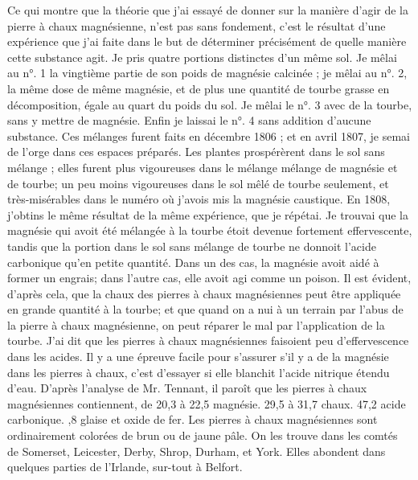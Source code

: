 Ce qui montre que la théorie que j'ai essayé de donner sur la manière d'agir de la pierre à chaux magnésienne, n'est pas sans fondement, c'est le résultat d'une expérience que j'ai faite dans le but de déterminer précisément de quelle manière cette substance agit. Je pris quatre portions distinctes d'un même sol. Je mêlai au n°. 1 la vingtième partie de son poids de magnésie calcinée ; je mêlai au n°. 2, la même dose de même magnésie, et de plus une quantité de tourbe grasse en décomposition, égale au quart du poids du sol. Je mêlai le n°. 3 avec de la tourbe, sans y mettre de magnésie. Enfin je laissai le n°. 4 sans addition d'aucune substance. Ces mélanges furent faits en décembre 1806 ; et en avril 1807, je semai de l'orge dans ces espaces préparés. Les plantes prospérèrent dans le sol sans mélange ; elles furent plus vigoureuses dans le mélange\setcounter{page}{227} mélange de magnésie et de tourbe; un peu moins vigoureuses dans le sol mêlé de tourbe seulement, et très-misérables dans le numéro où j'avois mis la magnésie caustique.
En 1808, j'obtins le même résultat de la même expérience, que je répétai. Je trouvai que la magnésie qui avoit été mélangée à la tourbe étoit devenue fortement effervescente, tandis que la portion dans le sol sans mélange de tourbe ne donnoit l'acide carbonique qu'en petite quantité. Dans un des cas, la magnésie avoit aidé à former un engrais; dans l'autre cas, elle avoit agi comme un poison.
Il est évident, d'après cela, que la chaux des pierres à chaux magnésiennes peut être appliquée en grande quantité à la tourbe; et que quand on a nui à un terrain par l'abus de la pierre à chaux magnésienne, on peut réparer le mal par l'application de la tourbe.
J'ai dit que les pierres à chaux magnésiennes faisoient peu d'effervescence dans les acides. Il y a une épreuve facile pour s'assurer s'il y a de la magnésie dans les pierres à chaux, c'est d'essayer si elle blanchit l'acide nitrique étendu d'eau.
D'après l'analyse de Mr. Tennant, il paroît\setcounter{page}{228} que les pierres à chaux magnésiennes contiennent,
de 20,3 à 22,5 magnésie.
29,5 à 31,7 chaux.
47,2 acide carbonique.
,8 glaise et oxide de fer.
Les pierres à chaux magnésiennes sont ordinairement colorées de brun ou de jaune pâle. On les trouve dans les comtés de Somerset, Leicester, Derby, Shrop, Durham, et York. Elles abondent dans quelques parties de l'Irlande, sur-tout à Belfort.
